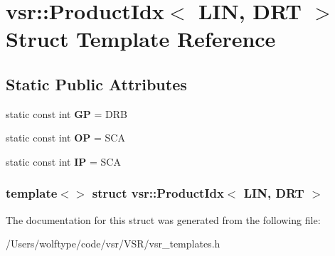 \hypertarget{structvsr_1_1_product_idx_3_01_l_i_n_00_01_d_r_t_01_4}{\section{vsr\-:\-:Product\-Idx$<$ L\-I\-N, D\-R\-T $>$ Struct Template Reference}
\label{structvsr_1_1_product_idx_3_01_l_i_n_00_01_d_r_t_01_4}
}
\subsection*{Static Public Attributes}
\begin{DoxyCompactItemize}
\item 
\hypertarget{structvsr_1_1_product_idx_3_01_l_i_n_00_01_d_r_t_01_4_ad4d17a44b6e3a9dfe5910b622531b97f}{static const int {\bfseries G\-P} = D\-R\-B}\label{structvsr_1_1_product_idx_3_01_l_i_n_00_01_d_r_t_01_4_ad4d17a44b6e3a9dfe5910b622531b97f}

\item 
\hypertarget{structvsr_1_1_product_idx_3_01_l_i_n_00_01_d_r_t_01_4_acd7cce72dab525780110fd1330d4b235}{static const int {\bfseries O\-P} = S\-C\-A}\label{structvsr_1_1_product_idx_3_01_l_i_n_00_01_d_r_t_01_4_acd7cce72dab525780110fd1330d4b235}

\item 
\hypertarget{structvsr_1_1_product_idx_3_01_l_i_n_00_01_d_r_t_01_4_a992deb90e82b3924bc9a4e4e3b9cff0d}{static const int {\bfseries I\-P} = S\-C\-A}\label{structvsr_1_1_product_idx_3_01_l_i_n_00_01_d_r_t_01_4_a992deb90e82b3924bc9a4e4e3b9cff0d}

\end{DoxyCompactItemize}
\subsubsection*{template$<$$>$ struct vsr\-::\-Product\-Idx$<$ L\-I\-N, D\-R\-T $>$}



The documentation for this struct was generated from the following file\-:\begin{DoxyCompactItemize}
\item 
/\-Users/wolftype/code/vsr/\-V\-S\-R/vsr\-\_\-templates.\-h\end{DoxyCompactItemize}
